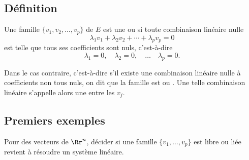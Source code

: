 \documentclass[class=report,crop=false]{standalone}
\begin{document}
\subsection{Définition}

\begin{definition}

Une famille $\{ v_1, v_2,\ldots, v_p \}$ de $E$ est une  ou
 si toute combinaison linéaire nulle
$$\lambda_1 v_1+\lambda_2 v_2+\cdots+\lambda_p v_p=0$$
est telle que tous ses coefficients sont nuls, c'est-à-dire
$$\lambda_1=0, \quad \lambda_2=0, \quad \ldots \quad \lambda_p=0.$$
\end{definition}

Dans le cas contraire,
c'est-à-dire s'il existe une combinaison linéaire nulle
à coefficients non tous nuls,
on dit que la famille est  ou .
Une telle combinaison linéaire s'appelle alors
une  entre les $ v_j$.

\subsection{Premiers exemples}

Pour des vecteurs de $\Rr^n$, décider si une famille
$\{v_1,\ldots,v_p\}$ est libre ou liée revient à résoudre un système linéaire.
\end{document}
